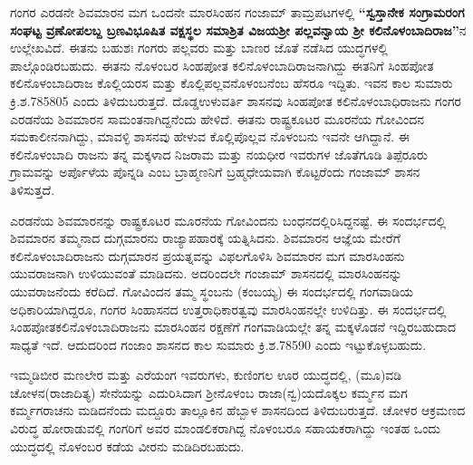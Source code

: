 ಗಂಗರ ಎರಡನೇ ಶಿವಮಾರನ ಮಗ ಒಂದನೇ ಮಾರಸಿಂಹನ ಗಂಜಾಮ್ ತಾಮ್ರಪಟಗಳಲ್ಲಿ \textbf{“ಸ್ವಸ್ತಾನೇಕ ಸಂಗ್ರಾಮರಂಗ ಸಂಘಟ್ಟ ವ್ರಣೋಪಲಬ್ದ ಬ್ರಣವಿಭೂಷಿತ ವಕ್ಷಸ್ಥಲ ಸಮಾಶ್ರಿತ ವಿಜಯಶ‍್ರೀ ಪಲ್ಲವನ್ವಾಯ ಶ‍್ರೀ ಕಲಿನೊಳಂಬಾದಿರಾಜ”}ನ ಉಲ್ಲೇಖವಿದೆ. ಈತನು ಬಹುಶಃ ಗಂಗರು ಪಲ್ಲವರು ಮತ್ತು ಬಾಣರ ಜೊತೆ ನಡೆಸಿದ ಯುದ್ಧಗಳಲ್ಲಿ ಪಾಲ್ಗೊಂಡಿರಬಹುದು. ಈತನು ನೊಳಂಬರ ಸಿಂಹಪೋತ ಕಲಿನೊಳಂಬಾದಿರಾಜನಾಗಿದ್ದು ಈತನಿಗೆ ಸಿಂಹಪೋತ ಕಲಿನೊಳಂಬಾದಿರಾಜ ಕೊಲ್ಲಿಯರಸ ಮತ್ತು ಕೊಲ್ಲಿಪಲ್ಲವನೊಳಂಬನೆಂಬ ಹೆಸರೂ ಇದ್ದಿತು. ಇವನ ಕಾಲ ಸುಮಾರು ಕ್ರಿ.ಶ.785\enginline{-}805 ಎಂದು ತಿಳಿದುಬರುತ್ತದೆ. ದೊಡ್ಡಉಳುವರ್ತಿ ಶಾಸನವು ಸಿಂಹಪೋತ ಕಲಿನೊಳಂಬಾಧಿರಾಜನು ಗಂಗರ ಎರಡನೆಯ ಶಿವಮಾರನ ಸಾಮಂತನಾಗಿದ್ದನೆಂದು ಹೇಳಿದೆ. ಈತನು ರಾಷ್ಟ್ರಕೂಟರ ಮೂರನೆಯ ಗೋವಿಂದನ ಸಮಕಾಲೀನನಾಗಿದ್ದು, ಮಾವಳ್ಳಿ ಶಾಸನವು ಹೇಳುವ ಕೊಲ್ಲಿಪೊಲ್ಲವ ನೊಳಂಬನು ಇವನೇ ಆಗಿದ್ದಾನೆ. ಈ ಕಲಿನೊಳಂಬಾದಿ ರಾಜನು ತನ್ನ ಮಕ್ಕಳಾದ ನಿಜರಾಮ ಮತ್ತು ನಯಧೀರ ಇವರುಗಳ ಜೊತೆಗೂಡಿ ತಿಪ್ಪೆರೂರು ಗ್ರಾಮವನ್ನು ಅರ್ಪೊಳೆಯ ಪೊನ್ನಡಿ ಎಂಬ ಬ್ರಾಹ್ಮಣನಿಗೆ ಬ್ರಹ್ಮಧೇಯವಾಗಿ ಕೊಟ್ಟರೆಂದು ಗಂಜಾಮ್ ಶಾಸನ ತಿಳಿಸುತ್ತದೆ.

ಎರಡನೆಯ ಶಿವಮಾರನನ್ನು ರಾಷ್ಟ್ರಕೂಟರ ಮೂರನೆಯ ಗೋವಿಂದನು ಬಂಧನದಲ್ಲಿರಿಸಿದ್ದನಷ್ಟೆ. ಈ ಸಂದರ್ಭದಲ್ಲಿ ಶಿವಮಾರನ ತಮ್ಮನಾದ ದುಗ್ಗಮಾರನು ರಾಜ್ಯಾಪಹಾರಕ್ಕೆ ಯತ್ನಿಸಿದನು. ಶಿವಮಾರನ ಆಜ್ಞೆಯ ಮೇರೆಗೆ ಕಲಿನೊಳಂಬಾದಿ\-ರಾಜನು ದುಗ್ಗಮಾರನ ಪ್ರಯತ್ನವನ್ನು ವಿಫಲಗೊಳಿಸಿ ಶಿವಮಾರನ ಮಗ ಮಾರಸಿಂಹನು ಯುವರಾಜನಾಗಿ ಉಳಿಯುವಂತೆ ಮಾಡಿದನು. ಅದರಿಂದಲೇ ಗಂಜಾಮ್ ಶಾಸನದಲ್ಲಿ ಮಾರಸಿಂಹನನ್ನು ಯುವರಾಜನೆಂದು ಕರೆದಿದೆ. ಗೋವಿಂದನ ತಮ್ಮ ಸ್ಥಂಬನು (ಕಂಬಯ್ಯ) ಈ ಸಂದರ್ಭದಲ್ಲಿ ಗಂಗವಾಡಿಯ ಅಧಿಕಾರಿಯಾಗಿದ್ದರೂ, ಗಂಗರ ಸಿಂಹಾಸನದ ಉತ್ತರಾಧಿಕಾರತ್ವವು ಮಾರಸಿಂಹನಲ್ಲೇ ಉಳಿದಿತ್ತು. ಈ ಸಂದರ್ಭದಲ್ಲಿ ಸಿಂಹಪೋತಕಲಿನೊಳಂಬಾದಿರಾಜನು ಮಾರಸಿಂಹನ ರಕ್ಷಣೆಗೆ ಗಂಗವಾಡಿ\-ಯಲ್ಲೇ ತನ್ನ ಮಕ್ಕಳೊಡನೆ ಇದ್ದಿರಬಹುದಾದ ಸಾಧ್ಯತೆ ಇದೆ. ಆದುದರಿಂದ ಗಂಜಾಂ ಶಾಸನದ ಕಾಲ ಸುಮಾರು ಕ್ರಿ.ಶ.785\enginline{-}90 ಎಂದು ಇಟ್ಟುಕೊಳ್ಳಬಹುದು.

ಇಮ್ಮಡಿಬೀರ ಮಣಲೇರ ಮತ್ತು ಎರೆಯಂಗ ಇವರುಗಳು, ಕುಣಿಂಗಲ ಊರ ಯುದ್ಧದಲ್ಲಿ, (ಮೂ)ವಡಿ ಚೋಳನ\break (ರಾಜಾದಿತ್ಯ) ಸೇನೆಯನ್ನು ಎದುರಿಸಿದಾಗ ಶ‍್ರೀನೊಳಂಬ ರಾಜಾ(ನ್ವ)ಯದೊಕ್ಕಲ ಕರ್ಮ್ಮನ ಮಗ ಕರ್ಮ್ಮಗರಾಚನು ಮಡಿದನೆಂದು ಮದ್ದೂರು ತಾಲ್ಲೂಕಿನ ಹೆಬ್ಬಾಳ ಶಾಸನದಿಂದ ತಿಳಿದುಬರುತ್ತದೆ. ಚೋಳರ ಆಕ್ರಮಣದ ವಿರುದ್ಧ ಹೋರಾಡುವಲ್ಲಿ ಗಂಗರಿಗೆ ಅವರ ಮಾಂಡಲಿಕರಾಗಿದ್ದ ನೊಳಂಬರೂ ಸಹಾಯಕರಾಗಿದ್ದು ಇಂತಹ ಒಂದು ಯುದ್ಧದಲ್ಲಿ ನೊಳಂಬರ ಕಡೆಯ ವೀರನು ಮಡಿದಿರಬಹುದು.


